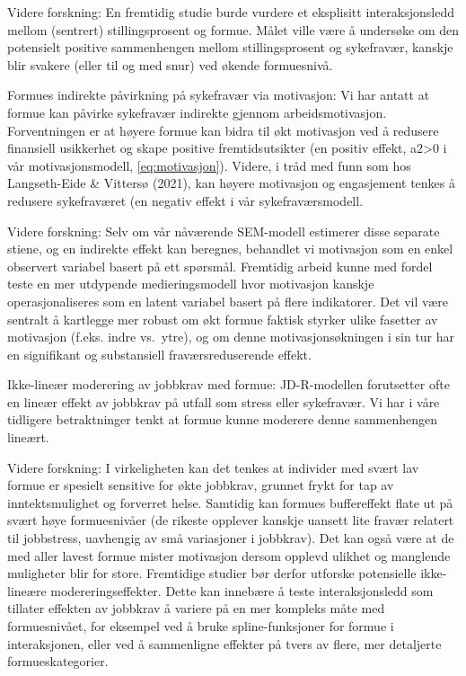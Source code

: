 \documentclass[
  12pt,
  a4paper,
  DIV=11,
  numbers=noendperiod]{scrartcl}
\begin{document}
Videre forskning: En fremtidig studie burde vurdere et eksplisitt
interaksjonsledd mellom (sentrert) stillingsprosent og formue. Målet
ville være å undersøke om den potensielt positive sammenhengen mellom
stillingsprosent og sykefravær, kanskje blir svakere (eller til og med
snur) ved økende formuesnivå.

Formues indirekte påvirkning på sykefravær via motivasjon: Vi har antatt
at formue kan påvirke sykefravær indirekte gjennom arbeidsmotivasjon.
Forventningen er at høyere formue kan bidra til økt motivasjon ved å
redusere finansiell usikkerhet og skape positive fremtidsutsikter (en
positiv effekt, a2\textgreater0 i vår motivasjonsmodell,
\autoref{eq:motivasjon}). Videre, i tråd med funn som hos Langseth-Eide
\& Vittersø (2021), kan høyere motivasjon og engasjement tenkes å
redusere sykefraværet (en negativ effekt i vår sykefraværsmodell.

Videre forskning: Selv om vår nåværende SEM-modell estimerer disse
separate stiene, og en indirekte effekt kan beregnes, behandlet vi
motivasjon som en enkel observert variabel basert på ett spørsmål.
Fremtidig arbeid kunne med fordel teste en mer utdypende
medieringsmodell hvor motivasjon kanskje operasjonaliseres som en latent
variabel basert på flere indikatorer. Det vil være sentralt å kartlegge
mer robust om økt formue faktisk styrker ulike fasetter av motivasjon
(f.eks. indre vs.~ytre), og om denne motivasjonsøkningen i sin tur har
en signifikant og substansiell fraværsreduserende effekt.

Ikke-lineær moderering av jobbkrav med formue: JD-R-modellen forutsetter
ofte en lineær effekt av jobbkrav på utfall som stress eller sykefravær.
Vi har i våre tidligere betraktninger tenkt at formue kunne moderere
denne sammenhengen lineært.

Videre forskning: I virkeligheten kan det tenkes at individer med svært
lav formue er spesielt sensitive for økte jobbkrav, grunnet frykt for
tap av inntektsmulighet og forverret helse. Samtidig kan formues
buffereffekt flate ut på svært høye formuesnivåer (de rikeste opplever
kanskje uansett lite fravær relatert til jobbstress, uavhengig av små
variasjoner i jobbkrav). Det kan også være at de med aller lavest formue
mister motivasjon dersom opplevd ulikhet og manglende muligheter blir
for store. Fremtidige studier bør derfor utforske potensielle
ikke-lineære modereringseffekter. Dette kan innebære å teste
interaksjonsledd som tillater effekten av jobbkrav å variere på en mer
kompleks måte med formuesnivået, for eksempel ved å bruke
spline-funksjoner for formue i interaksjonen, eller ved å sammenligne
effekter på tvers av flere, mer detaljerte formueskategorier.
\end{document}
